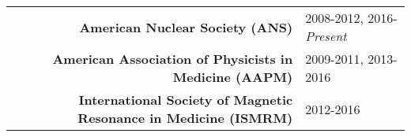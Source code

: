 
\begin{minipage}{\textwidth}
	\begin{center}
		\begin{tabular}{rl}
			\textbf{American Nuclear Society (ANS)} & 2008-2012, 2016-\emph{Present} \\
			\textbf{American Association of Physicists in Medicine (AAPM)} & 2009-2011, 2013-2016 \\
			\textbf{International Society of Magnetic Resonance in Medicine (ISMRM)} & 2012-2016 \\
		\end{tabular}
	\end{center}
\end{minipage}
